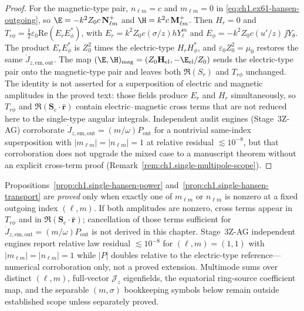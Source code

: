 \begin{proof}
For the magnetic-type pair, $n_{\ell m}=c$ and $m_{\ell m}=0$ in \eqref{eq:ch1.ex61-hansen-outgoing}, so $\E=-k^2 Z_0 c\,\mathbf N_{\ell m}^+$ and $\H=k^2 c\,\mathbf M_{\ell m}^+$. Then $H_r=0$ and $T_{r\phi}=\tfrac12\varepsilon_0\mathrm{Re}(E_r E_\phi^*)$, with $E_r=k^2 Z_0 c(\sigma/z)h Y_\ell^m$ and $E_\phi=-k^2 Z_0 c(u'/z)\,\jj Y_\theta$. The product $E_r E_\phi^*$ is $Z_0^2$ times the electric-type $H_r H_\phi^*$, and $\varepsilon_0 Z_0^2=\mu_0$ restores the same $\dot J_{z,\mathrm{em,out}}$. The map $(\E,\H)_{\mathrm{mag}}=(Z_0\mathbf H_{\mathrm{el}},-\E_{\mathrm{el}}/Z_0)$ sends the electric-type pair onto the magnetic-type pair and leaves both $\Re(S_r)$ and $T_{r\phi}$ unchanged. The identity is not asserted for a superposition of electric and magnetic amplitudes in the proved text: those fields produce $E_r$ and $H_r$ simultaneously, so $T_{r\phi}$ and $\Re(\mathbf S_\mathrm{c}\cdot\hat{\mathbf r})$ contain electric--magnetic cross terms that are not reduced here to the single-type angular integrals. Independent audit engines (Stage~3Z-AG) corroborate $\dot J_{z,\mathrm{em,out}}=(m/\omega)P_{\mathrm{out}}$ for a nontrivial same-index superposition with $|m_{\ell m}|=|n_{\ell m}|=1$ at relative residual $\lesssim10^{-8}$, but that corroboration does not upgrade the mixed case to a manuscript theorem without an explicit cross-term proof (Remark~\ref{rem:ch1.single-multipole-scope}).
\end{proof}

\begin{remark}
\label{rem:ch1.single-multipole-scope}
Propositions~\ref{prop:ch1.single-hansen-power} and~\ref{prop:ch1.single-hansen-transport} are \emph{proved} only when exactly one of $m_{\ell m}$ or $n_{\ell m}$ is nonzero at a fixed outgoing index $(\ell,m)$. If both amplitudes are nonzero, cross terms appear in $T_{r\phi}$ and in $\Re(\mathbf S_\mathrm{c}\cdot\hat{\mathbf r})$; cancellation of those terms sufficient for $\dot J_{z,\mathrm{em,out}}=(m/\omega)P_{\mathrm{out}}$ is not derived in this chapter. Stage~3Z-AG independent engines report relative law residual $\lesssim10^{-8}$ for $(\ell,m)=(1,1)$ with $|m_{\ell m}|=|n_{\ell m}|=1$ while $|P|$ doubles relative to the electric-type reference---numerical corroboration only, not a proved extension. Multimode sums over distinct $(\ell,m)$, full-vector $\mathcal{J}_z$ eigenfields, the equatorial ring-source coefficient map, and the separable $(m,\sigma)$ bookkeeping symbols below remain outside established scope unless separately proved.
\end{remark}

